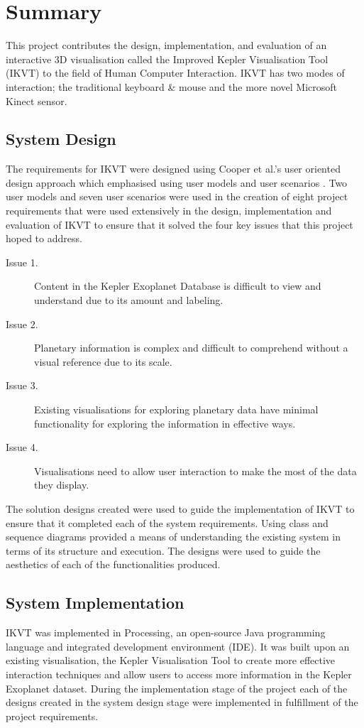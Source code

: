 \chapter{Summary}\label{C:con}
This project contributes the design,
implementation, and evaluation of an
interactive 3D visualisation called the Improved Kepler Visualisation Tool
(IKVT) to the field of Human Computer Interaction. IKVT has two modes of
interaction; the traditional keyboard \& mouse and
the more novel Microsoft Kinect sensor. 

\section{System Design}
The requirements for IKVT were designed using Cooper et al.'s user oriented
design approach which emphasised using user models and user scenarios
\cite{AboutFace3}.  Two user
models and seven user scenarios were used in the creation of eight project
requirements that
were used extensively in the design, implementation and evaluation of IKVT to
ensure that it
solved the four key issues that this project hoped to address.
\begin{description}
 \item[Issue 1.] Content in the Kepler Exoplanet Database is difficult to view
and
understand due to its amount and labeling.
 \item[Issue 2.] Planetary information is complex and difficult to comprehend
without
a visual reference due to its scale.
 \item[Issue 3.] Existing visualisations for exploring planetary data have
minimal
functionality for exploring the information in effective ways.
 \item[Issue 4.] Visualisations need to allow user interaction to make the most
of the data they display.
\end{description}


The solution designs created were used to guide the implementation of IKVT to
ensure that it completed each of the system requirements. Using class and
sequence diagrams provided a means of understanding the existing system in terms
of its structure and execution. The designs were used to guide the aesthetics of
each of the functionalities produced. 
\section{System Implementation}
IKVT was implemented in Processing, an open-source Java programming language and
integrated development environment (IDE). It was built upon an existing
visualisation, the Kepler Visualisation Tool \cite{kepler_github,
kepler_article} to create more effective interaction techniques and allow users
to access more information in the Kepler Exoplanet dataset. During the
implementation stage of the project each of the
designs created in the system design stage were implemented in
fulfillment of the project requirements. 

